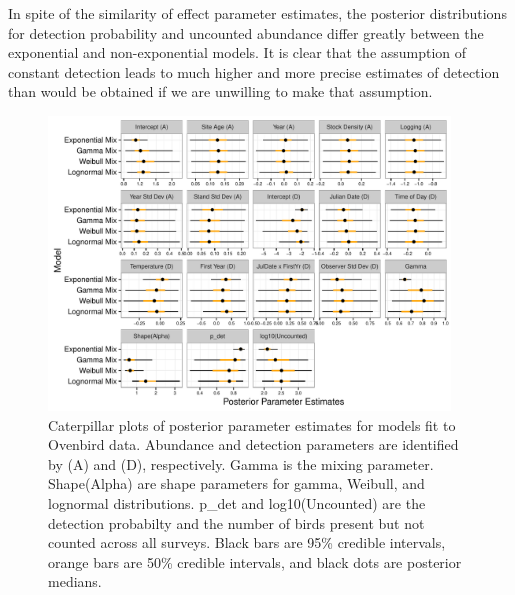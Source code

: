 \documentclass[useAMS,usenatbib,referee,12pt]{article}
\newif\ifdic   %
\begin{document}
\ifdic
DIC calculations preferred the exponential mixture TTDD to the lognormal, Weibull, and gamma mixtures (differences of 6.95, 10.7, and 11.5, respectively).  
These differences closely mirror those from the exponential mixture dataset in Sim3, but they also mirror those from the nonpeaked lognormal mixture dataset, where the exponential mixture 95\% credible interval for abundance did not contain the true value, and its posterior median was negatively biased by 18\% of the actual abundance.
\fi

In spite of the similarity of effect parameter estimates, the posterior distributions for detection probability and uncounted abundance differ greatly between the exponential and non-exponential models.  
It is clear that the assumption of constant detection leads to much higher and more precise estimates of detection than would be obtained if we are unwilling to make that assumption.



\begin{figure}[h!]\centering
\includegraphics[width=0.95\textwidth]{OVEN/oven_sum/OVEN_Posteriors.pdf}
\caption{\label{ovenposteriors} Caterpillar plots of posterior parameter estimates for models fit to Ovenbird data.  
Abundance and detection parameters are identified by (A) and (D), respectively.  
Gamma is the mixing parameter.  
Shape(Alpha) are shape parameters for gamma, Weibull, and lognormal distributions.  
p\_det and log10(Uncounted) are the detection probabilty and the number of birds present but not counted across all surveys.  
Black bars are 95\% credible intervals, orange bars are 50\% credible intervals, and black dots are posterior medians.}
\end{figure}
\end{document}
